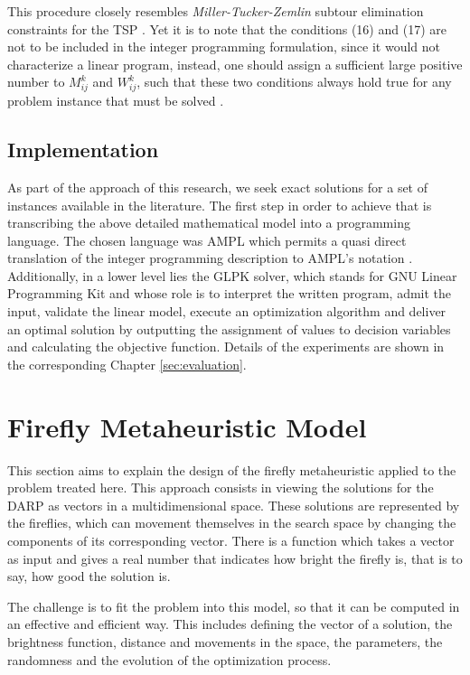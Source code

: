 \documentclass[tuberlin,cic,tc,openright,english,noabntcite,oneside]{iiufrgs}
\begin{document}
This procedure closely resembles \emph{Miller-Tucker-Zemlin} subtour elimination constraints for the TSP \parencite[p. 575]{cordeau_branch-and-cut_2006}. Yet it is to note that the conditions (16) and (17) are not to be included in the integer programming formulation, since it would not characterize a linear program, instead, one should assign a sufficient large positive number to $M_{ij}^k$ and $W_{ij}^k$, such that these two conditions always hold true for any problem instance that must be solved \parencite[p. 44]{hall_integrated_2009}.

\subsection{Implementation}
As part of the approach of this research, we seek exact solutions for a set of instances available in the literature. The first step in order to achieve that is transcribing the above detailed mathematical model into a programming language. The chosen language was AMPL which permits a quasi direct translation of the integer programming description to AMPL's notation \parencite[p. 520]{fourer_modeling_1990}. Additionally, in a lower level lies the GLPK solver, which stands for GNU Linear Programming Kit and whose role is to interpret the written program, admit the input, validate the linear model, execute an optimization algorithm and deliver an optimal solution by outputting the assignment of values to decision variables and calculating the objective function. Details of the experiments are shown in the corresponding Chapter \ref{sec:evaluation}.

\section{Firefly Metaheuristic Model}
This section aims to explain the design of the firefly metaheuristic applied to the problem treated here. This approach consists in viewing the solutions for the DARP as vectors in a multidimensional space. These solutions are represented by the fireflies, which can movement themselves in the search space by changing the components of its corresponding vector. There is a function which takes a vector as input and gives a real number that indicates how bright the firefly is, that is to say, how good the solution is.

The challenge is to fit the problem into this model, so that it can be computed in an effective and efficient way. This includes defining the vector of a solution, the brightness function, distance and movements in the space, the parameters, the randomness and the evolution of the optimization process.
\end{document}
